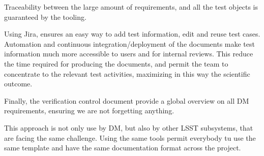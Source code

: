 Traceability between the large amount of requirements, and all the test objects is guaranteed by the tooling.

Using Jira, ensures an easy way to add test information, edit and reuse test cases.
Automation and continuous integration/deployment of the documents make test information much more accessible to users and for internal reviews.
This reduce the time required for producing the documents, and permit the team to concentrate to the relevant test activities, maximizing in this way the scientific outcome.

Finally, the verification control document provide a global overview on all DM requirements, ensuring we are not forgetting anything.

This approach is not only use by DM, but also by other LSST subsystems, that are facing the same challenge.
Using the same tools permit everybody tu use the same template and have the same documentation format across the project.



